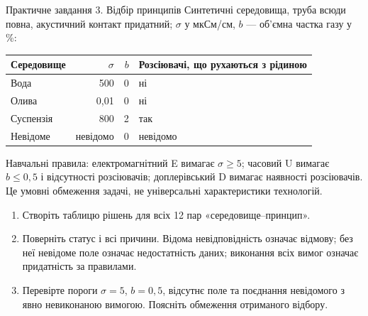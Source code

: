 \documentclass[aspectratio=169,11pt]{beamer}
\begin{document}
\begin{frame}{Практичне завдання 3. Відбір принципів}
\scriptsize
Синтетичні середовища, труба всюди повна, акустичний контакт придатний; $\sigma$ у мкСм/см, $b$ --- об'ємна частка газу у \%:
\begin{center}
\begin{tabular}{lrrl}
\toprule Середовище & $\sigma$ & $b$ & Розсіювачі, що рухаються з рідиною\\\midrule
Вода & 500 & 0 & ні\\
Олива & 0,01 & 0 & ні\\
Суспензія & 800 & 2 & так\\
Невідоме & невідомо & 0 & невідомо\\\bottomrule
\end{tabular}
\end{center}
Навчальні правила: електромагнітний E вимагає $\sigma\ge5$; часовий U вимагає $b\le0{,}5$ і відсутності розсіювачів; доплерівський D вимагає наявності розсіювачів. Це умовні обмеження задачі, не універсальні характеристики технологій.
\begin{enumerate}
\item Створіть таблицю рішень для всіх 12 пар «середовище--принцип».
\item Поверніть статус і всі причини. Відома невідповідність означає відмову; без неї невідоме поле означає недостатність даних; виконання всіх вимог означає придатність за правилами.
\item Перевірте пороги $\sigma=5$, $b=0{,}5$, відсутнє поле та поєднання невідомого з явно невиконаною вимогою. Поясніть обмеження отриманого відбору.
\end{enumerate}
\end{frame}
\end{document}

